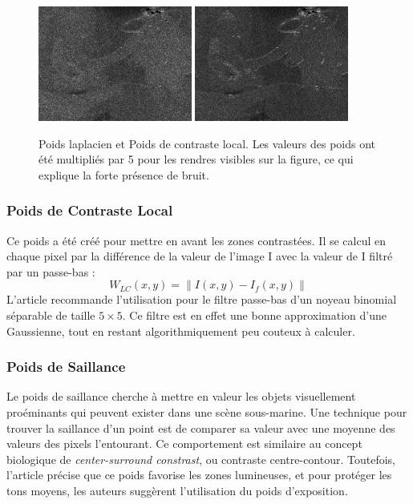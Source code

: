 \documentclass[twoside]{article}
\begin{document}
\begin{figure}[]
  \centering
  \includegraphics[width=0.45\textwidth]{Support/laplacian.png}
  \includegraphics[width=0.45\textwidth]{Support/lc.png}

  \caption{Poids laplacien et Poids de contraste local. Les valeurs des poids ont été multipliés par 5 pour les rendres visibles sur la figure, ce qui explique la forte présence de bruit.}
\end{figure}

\subsubsection{Poids de Contraste Local}

Ce poids a été créé pour mettre en avant les zones contrastées. Il se calcul en chaque pixel par la différence de la valeur de l'image I avec la valeur de I filtré par un passe-bas : $$ W_{LC}(x,y) = \|I(x,y) - I_{f}(x,y)\| $$
L'article recommande l'utilisation pour le filtre passe-bas d'un noyeau binomial séparable de taille $5 \times 5$. Ce filtre est en effet une bonne approximation d'une Gaussienne, tout en restant algorithmiquement peu couteux à calculer.

\subsubsection{Poids de Saillance}
Le poids de saillance cherche à mettre en valeur les objets visuellement proéminants qui peuvent exister dans une scène sous-marine. Une technique pour trouver la saillance d'un point est de comparer sa valeur avec une moyenne des valeurs des pixels l'entourant. Ce comportement est similaire au concept biologique de \emph{center-surround constrast}, ou contraste centre-contour. Toutefois, l'article précise que ce poids favorise les zones lumineuses, et pour protéger les tons moyens, les auteurs suggèrent l'utilisation du poids d'exposition.
\end{document}
